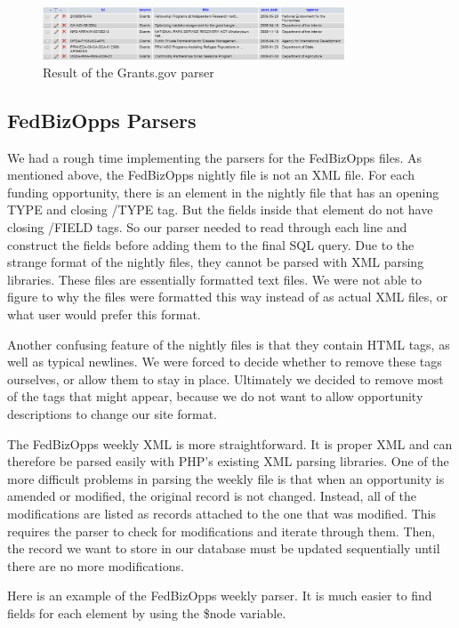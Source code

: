 \documentclass[onecolumn]{IEEEtran}
\begin{document}
\begin{figure}
    \centering
    \includegraphics[width=0.8\textwidth]{senior_design_grants_db.png}
    \caption{Result of the Grants.gov parser}
    \label{fig:grants_db}
\end{figure}

\subsection{FedBizOpps Parsers}
We had a rough time implementing the parsers for the FedBizOpps files. As mentioned above, the FedBizOpps nightly file is not an XML file. For each funding opportunity, there is an element in the nightly file that has an opening TYPE and closing /TYPE tag. But the fields inside that element do not have closing /FIELD tags. So our parser needed to read through each line and construct the fields before adding them to the final SQL query. Due to the strange format of the nightly files, they cannot be parsed with XML parsing libraries. These files are essentially formatted text files. We were not able to figure to why the files were formatted this way instead of as actual XML files, or what user would prefer this format.  

Another confusing feature of the nightly files is that they contain HTML tags, as well as typical newlines. We were forced to decide whether to remove these tags ourselves, or allow them to stay in place. Ultimately we decided to remove most of the tags that might appear, because we do not want to allow opportunity descriptions to change our site format. 

The FedBizOpps weekly XML is more straightforward. It is proper XML and can therefore be parsed easily with PHP's existing XML parsing libraries. One of the more difficult problems in parsing the weekly file is that when an opportunity is amended or modified, the original record is not changed. Instead, all of the modifications are listed as records attached to the one that was modified. This requires the parser to check for modifications and iterate through them. Then, the record we want to store in our database must be updated sequentially until there are no more modifications.

Here is an example of the FedBizOpps weekly parser. It is much easier to find fields for each element by using the \$node variable.

\end{document}
